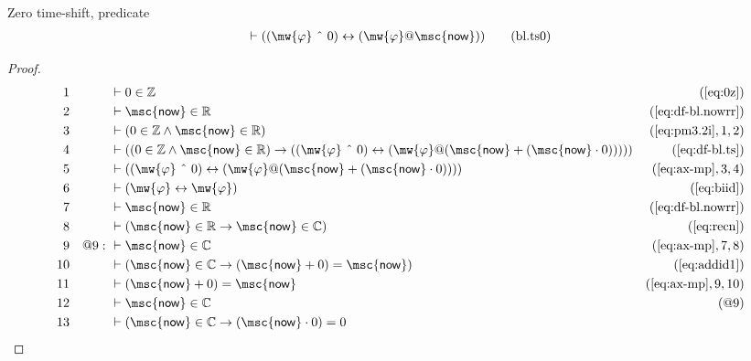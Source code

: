 \begin{lemma} {Zero time-shift, predicate}
\begin{align}
\vdash ( ( \mw{\varphi} ~\string^~ 0 ) \leftrightarrow ( \mw{\varphi} @
    \mathsf{\msc{now}} ) )\label{eq:bl.ts0}\tag{bl.ts0}
\end{align}
\end{lemma}


\begin{proof}
\begin{align}
  1 &&  & \vdash 0 \in \mathbb{Z}&(\mbox{\ref{eq:0z}})\notag
  \\ 2 &&  & \vdash \mathsf{\msc{now}} \in
    \mathbb{R}&(\mbox{\ref{eq:df-bl.nowrr}})\notag
  \\ 3 &&  & \vdash ( 0 \in \mathbb{Z} \wedge \mathsf{\msc{now}} \in \mathbb{R}
    )&(\mbox{\ref{eq:pm3.2i}},1,2)\notag
  \\ 4 &&  & \vdash ( ( 0 \in \mathbb{Z} \wedge \mathsf{\msc{now}} \in
    \mathbb{R} ) \rightarrow 
       ( ( \mw{\varphi} ~\string^~
    0 ) \leftrightarrow ( \mw{\varphi} @ (
    \mathsf{\msc{now}} + ( \mathsf{\msc{now}} \cdot 0 ) )
    ) ) )&(\mbox{\ref{eq:df-bl.ts}})\notag
  \\ 5 &&  & \vdash ( ( \mw{\varphi} ~\string^~ 0 ) \leftrightarrow (
    \mw{\varphi} @ ( \mathsf{\msc{now}} + (
    \mathsf{\msc{now}} \cdot 0 ) ) )
    )&(\mbox{\ref{eq:ax-mp}},3,4)\notag
  \\ 6 &&  & \vdash ( \mw{\varphi} \leftrightarrow \mw{\varphi}
    )&(\mbox{\ref{eq:biid}})\notag
  \\ 7 &&  & \vdash \mathsf{\msc{now}} \in
    \mathbb{R}&(\mbox{\ref{eq:df-bl.nowrr}})\notag
  \\ 8 &&  & \vdash ( \mathsf{\msc{now}} \in \mathbb{R} \rightarrow
    \mathsf{\msc{now}} \in \mathbb{C}
    )&(\mbox{\ref{eq:recn}})\notag
  \\ 9 && @9:\  & \vdash \mathsf{\msc{now}} \in
    \mathbb{C}&(\mbox{\ref{eq:ax-mp}},7,8)\notag
  \\ 10 &&  & \vdash ( \mathsf{\msc{now}} \in \mathbb{C} \rightarrow (
    \mathsf{\msc{now}} + 0 ) = \mathsf{\msc{now}}
    )&(\mbox{\ref{eq:addid1}})\notag
  \\ 11 &&  & \vdash ( \mathsf{\msc{now}} + 0 ) =
    \mathsf{\msc{now}}&(\mbox{\ref{eq:ax-mp}},9,10)\notag
  \\ 12 &&  & \vdash \mathsf{\msc{now}} \in \mathbb{C}&(@9)\notag
  \\ 13 &&  & \vdash ( \mathsf{\msc{now}} \in \mathbb{C} \rightarrow (
    \mathsf{\msc{now}} \cdot 0 ) = 0

\end{align}
\end{proof}

